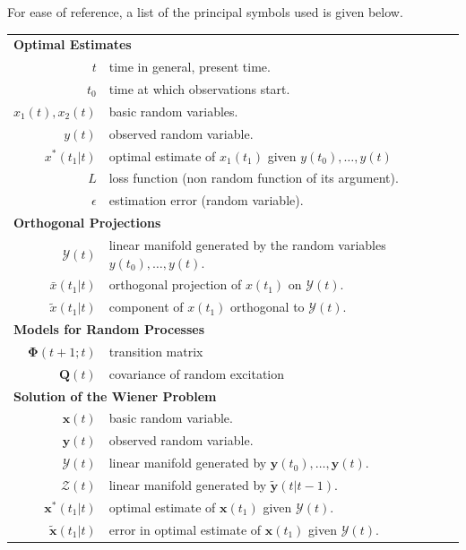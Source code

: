 \documentclass{article}
\newcommand{\manf}[1]{\mathbf{\mathcal{#1}}}
\begin{document}
For ease of reference, a list of the principal symbols used is given below.
\begin{table}[htbp]
\centering
\begin{tabular}{rl}
\multicolumn{2}{l}{\textbf{Optimal Estimates}}\\
$t$ & time in general, present time.\\
$t_0$ & time at which observations start.\\
$x_1(t),x_2(t)$ & basic random variables.\\
$y(t)$ & observed random variable.\\
$x^\ast (t_1 \vert t)$ & optimal estimate of $x_1(t_1)$ given $y(t_0), \dotsc, y(t)$\\
$L$ & loss function (non random function of its argument).\\
$\epsilon$ & estimation error (random variable).\\
\multicolumn{2}{l}{\textbf{Orthogonal Projections}}\\
$\mathbf{\mathcal{Y}}(t)$ & linear manifold generated by the random variables $y(t_0), \dotsc, y(t)$.\\
$\bar{x}(t_1 \vert t)$ & orthogonal projection of $x(t_1)$ on $\mathbf{\mathcal{Y}}(t)$.\\
$\tilde{x}(t_1 \vert t)$ & component of $x(t_1)$ orthogonal to $\mathbf{\mathcal{Y}}(t)$.\\
\multicolumn{2}{l}{\textbf{Models for Random Processes}}\\
$\boldsymbol{\Phi}(t+1 ; t)$ & transition matrix\\
$\mathbf{Q}(t)$ & covariance of random excitation\\
\multicolumn{2}{l}{\textbf{Solution of the Wiener Problem}}\\
$\mathbf{x}(t)$ & basic random variable.\\
$\mathbf{y}(t)$ & observed random variable.\\
$\manf{Y}(t)$ & linear manifold generated by $\mathbf{y}(t_0), \dotsc, \mathbf{y}(t)$.\\
$\manf{Z}(t)$ & linear manifold generated by $\tilde{\mathbf{y}}(t \vert t-1)$.\\
$\mathbf{x}^\ast(t_1 \vert t)$ & optimal estimate of $\mathbf{x}(t_1)$ given $\manf{Y}(t)$.\\
$\tilde{\mathbf{x}}(t_1 \vert t)$ & error in optimal estimate of $\mathbf{x}(t_1)$ given $\manf{Y}(t)$.
\end{tabular}
\end{table}
\end{document}
